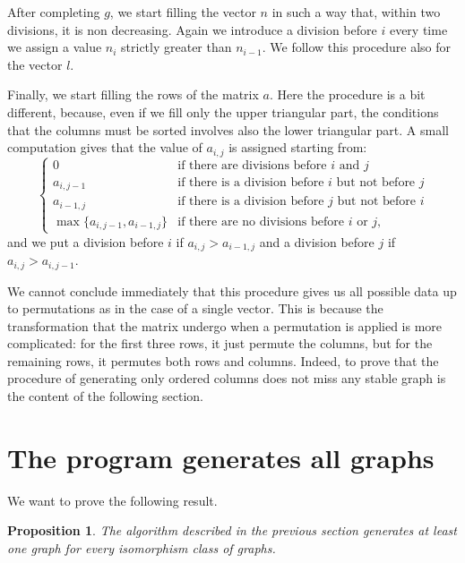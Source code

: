 \documentclass{amsart}
\theoremstyle{plain}
\newtheorem{proposition}[theorem]{Proposition}
\theoremstyle{definition}
\newtheorem{remark}[theorem]{Remark}
\begin{document}
After completing $g$, we start filling the vector $n$ in such
a way that, within two divisions, it is non decreasing. Again we
introduce a division before $i$ every time we assign a value $n_i$
strictly greater than $n_{i-1}$. We follow this procedure also for the
vector $l$.

Finally, we start filling the rows of the matrix $a$. Here the
procedure is a bit different, because, even if we fill only the upper
triangular part, the conditions that the columns must be sorted
involves also the lower triangular part. A small computation gives
that the value of $a_{i,j}$ is assigned starting from:
\[
\begin{cases}
  0 & \text{if there are divisions before $i$ and $j$}\\
  a_{i,j-1} & \text{if there is a division before $i$ but not before
    $j$}\\
  a_{i-1,j} & \text{if there is a division before $j$ but not before
    $i$}\\
  \max\{a_{i,j-1}, a_{i-1,j}\} & \text{if there are no divisions
    before $i$ or $j$,}
\end{cases}
\]
and we put a division before $i$ if $a_{i,j} > a_{i-1,j}$ and a division
before $j$ if $a_{i,j} > a_{i,j-1}$.

  We cannot conclude immediately that this procedure gives us all
  possible data up to permutations as in the case of a single
  vector. This is because the transformation that the matrix undergo
  when a permutation is applied is more complicated: for the first
  three rows, it just permute the columns, but for the remaining rows,
  it permutes both rows and columns. Indeed, to prove that the procedure
  of generating only ordered columns does not miss any stable graph 
  is the content of the following section.
\section{The program generates all graphs}\label{sec:proof}

We want to prove the following result.

\begin{proposition}\label{prop:main}
  The algorithm described in the previous section generates at least
  one graph for every isomorphism class of graphs.
\end{proposition}
\end{document}
